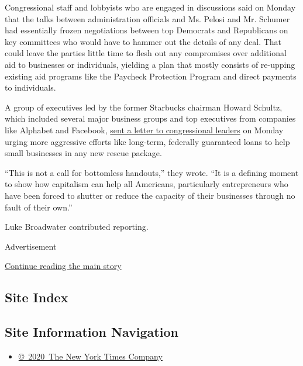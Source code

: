 Congressional staff and lobbyists who are engaged in discussions said on
Monday that the talks between administration officials and Ms. Pelosi
and Mr. Schumer had essentially frozen negotiations between top
Democrats and Republicans on key committees who would have to hammer out
the details of any deal. That could leave the parties little time to
flesh out any compromises over additional aid to businesses or
individuals, yielding a plan that mostly consists of re-upping existing
aid programs like the Paycheck Protection Program and direct payments to
individuals.

A group of executives led by the former Starbucks chairman Howard
Schultz, which included several major business groups and top executives
from companies like Alphabet and Facebook,
\href{https://www.howardschultz.com/lettertocongress/}{sent a letter to
congressional leaders} on Monday urging more aggressive efforts like
long-term, federally guaranteed loans to help small businesses in any
new rescue package.

``This is not a call for bottomless handouts,'' they wrote. ``It is a
defining moment to show how capitalism can help all Americans,
particularly entrepreneurs who have been forced to shutter or reduce the
capacity of their businesses through no fault of their own.''

Luke Broadwater contributed reporting.

Advertisement

\protect\hyperlink{after-bottom}{Continue reading the main story}

\hypertarget{site-index}{%
\subsection{Site Index}\label{site-index}}

\hypertarget{site-information-navigation}{%
\subsection{Site Information
Navigation}\label{site-information-navigation}}

\begin{itemize}
\tightlist
\item
  \href{https://help.nytimes3xbfgragh.onion/hc/en-us/articles/115014792127-Copyright-notice}{©~2020~The
  New York Times Company}
\end{itemize}

